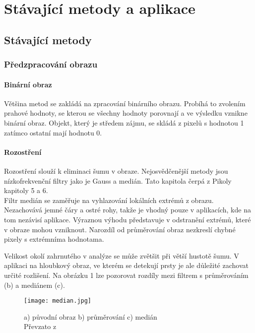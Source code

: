 \textit{}\chapter{Stávající metody a aplikace}

\section{Stávající metody}
\subsection{Předzpracování obrazu}
\subsubsection{Binární obraz}
Většina metod se zakládá na zpracování binárního obrazu. Probíhá to zvolením prahové hodnoty, se kterou se všechny hodnoty porovnají a ve výsledku vznikne binární obraz. Objekt, který je středem zájmu, se skládá z pixelů s hodnotou 1 zatímco ostatní mají hodnotu 0.
\subsubsection{Rozostření}
Rozostření slouží k eliminaci šumu v obraze. Nejosvědčenější metody jsou nízkofrekvenční filtry jako je Gauss a medián. Tato kapitola čerpá z Pikoly~\cite{15} kapitoly 5 a 6.\\

Filtr medián se zaměřuje na vyhlazování lokálních extrémů z obrazu. Nezachovává jemné čáry a ostré rohy, takže je vhodný pouze v aplikacích, kde na tom nezávisí aplikace. Výraznou výhodu představuje v odstranění extrémů, které v obraze mohou vzniknout. Narozdíl od průměrování obraz nezkreslí chybné pixely s extrémníma hodnotama. %
 
Velikost okolí zahrnutého v analýze se může zvětšit při větší hustotě šumu. V aplikaci na hloubkový obraz, ve kterém se detekují prsty je ale důležité zachovat určité rozlišení. Na obrázku 1 lze pozorovat rozdíly mezi filtrem s průměrováním (b) a mediánem (c).\\

\begin{figure}[h]
\centering
\texttt{[image: median.jpg]}
\caption{a) původní obraz b) průměrování c) medián\\
 Převzato z ~\cite{15} }
\end{figure}


